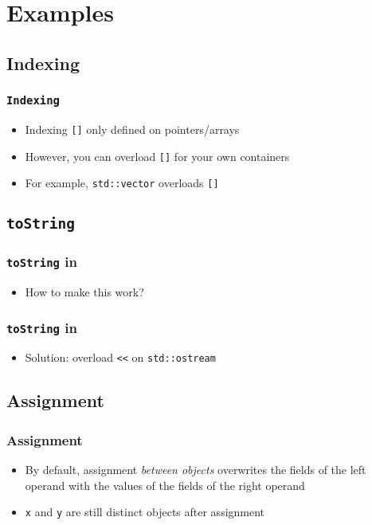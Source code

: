 \section{Examples}
\subsection{Indexing}
\frame{\tableofcontents[currentsubsection]}

\begin{frame}
  \frametitle{\tt Indexing}
  \begin{itemize}
    \item Indexing \texttt{[]} only defined on pointers/arrays
    \item However, you can overload \texttt{[]} for your own containers
    \item For example, \texttt{std::vector} overloads \texttt{[]}
  \end{itemize}
\end{frame}

\subsection{\texttt{toString}}
\frame{\tableofcontents[currentsubsection]}

\begin{frame}
  \frametitle{\texttt{toString} in \cpp}
  \begin{itemize}
    \item How to make this work?
  \end{itemize}
\end{frame}

\begin{frame}
  \frametitle{\texttt{toString} in \cpp}
  \begin{itemize}
    \item Solution: overload \texttt{<<} on \texttt{std::ostream}
  \end{itemize}
\end{frame}

\subsection{Assignment}
\frame{\tableofcontents[currentsubsection]}

\begin{frame}
  \frametitle{Assignment}
  \begin{itemize}
    \item By default, assignment \emph{between objects} overwrites the fields of the left operand
          with the values of the fields of the right operand
    \item \texttt{x} and \texttt{y} are still distinct objects after assignment
  \end{itemize}
\end{frame}

